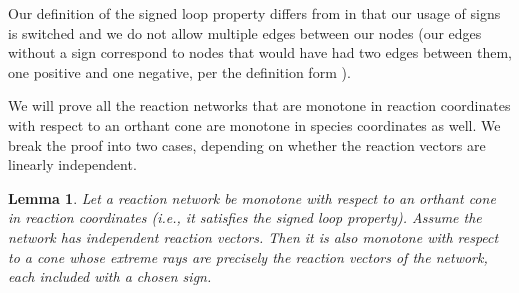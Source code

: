 \documentclass{article}
\newtheorem{lem}{Lemma}
\begin{document}
Our definition of the signed loop property differs from \cite{Angeli2010-hj} in that our usage of signs is switched and we do not allow multiple edges between our nodes (our edges without a sign correspond to nodes that would have had two edges between them, one positive and one negative, per the definition form \cite{Angeli2010-hj}).



We will prove all the reaction networks that are monotone in reaction coordinates with respect to an orthant cone are monotone in species coordinates as well. We break the proof into two cases, depending on whether the reaction vectors are linearly independent.



\begin{lem}
\label{lem:reaction_coords_independent}
Let a reaction network be monotone with respect to an orthant cone in reaction coordinates (i.e., it satisfies the signed loop property). Assume the network has independent reaction vectors. Then it is also monotone with respect to a cone whose extreme rays are precisely the reaction vectors of the network, each included with a chosen sign.
\end{lem}
\end{document}
